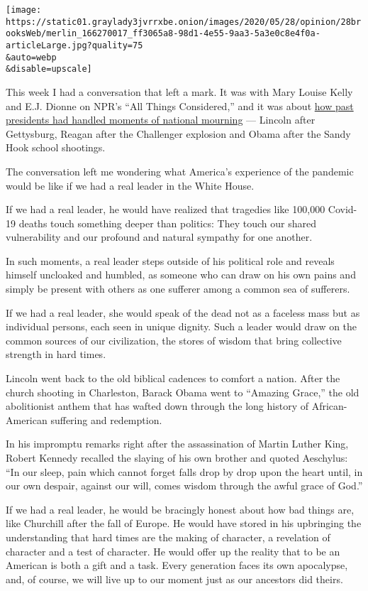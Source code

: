 \texttt{[image: https://static01.graylady3jvrrxbe.onion/images/2020/05/28/opinion/28brooksWeb/merlin\_166270017\_ff3065a8-98d1-4e55-9aa3-5a3e0c8e4f0a-articleLarge.jpg?quality=75\\\&auto=webp\\\&disable=upscale]}

This week I had a conversation that left a mark. It was with Mary Louise
Kelly and E.J. Dionne on NPR's ``All Things Considered,'' and it was
about
\href{https://www.npr.org/2020/05/27/863422824/how-presidents-lead-in-times-of-national-mourning}{how
past presidents had handled moments of national mourning} --- Lincoln
after Gettysburg, Reagan after the Challenger explosion and Obama after
the Sandy Hook school shootings.

The conversation left me wondering what America's experience of the
pandemic would be like if we had a real leader in the White House.

If we had a real leader, he would have realized that tragedies like
100,000 Covid-19 deaths touch something deeper than politics: They touch
our shared vulnerability and our profound and natural sympathy for one
another.

In such moments, a real leader steps outside of his political role and
reveals himself uncloaked and humbled, as someone who can draw on his
own pains and simply be present with others as one sufferer among a
common sea of sufferers.

If we had a real leader, she would speak of the dead not as a faceless
mass but as individual persons, each seen in unique dignity. Such a
leader would draw on the common sources of our civilization, the stores
of wisdom that bring collective strength in hard times.

Lincoln went back to the old biblical cadences to comfort a nation.
After the church shooting in Charleston, Barack Obama went to ``Amazing
Grace,'' the old abolitionist anthem that has wafted down through the
long history of African-American suffering and redemption.

In his impromptu remarks right after the assassination of Martin Luther
King, Robert Kennedy recalled the slaying of his own brother and quoted
Aeschylus: ``In our sleep, pain which cannot forget falls drop by drop
upon the heart until, in our own despair, against our will, comes wisdom
through the awful grace of God.''

If we had a real leader, he would be bracingly honest about how bad
things are, like Churchill after the fall of Europe. He would have
stored in his upbringing the understanding that hard times are the
making of character, a revelation of character and a test of character.
He would offer up the reality that to be an American is both a gift and
a task. Every generation faces its own apocalypse, and, of course, we
will live up to our moment just as our ancestors did theirs.


